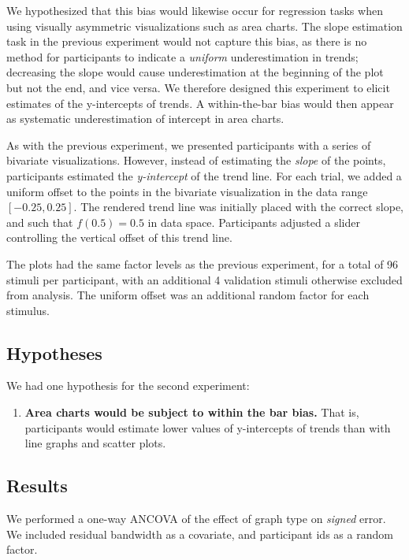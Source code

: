 \documentclass{sigchi}
\begin{document}
We hypothesized that this bias would likewise occur for regression tasks when using visually asymmetric visualizations such as area charts. The slope estimation task in the previous experiment would not capture this bias, as there is no method for participants to indicate a \emph{uniform} underestimation in trends; decreasing the slope would cause underestimation at the beginning of the plot but not the end, and vice versa. We therefore designed this experiment to elicit estimates of the y-intercepts of trends. A within-the-bar bias would then appear as systematic underestimation of intercept in area charts.

As with the previous experiment, we presented participants with a series of bivariate visualizations. However, instead of estimating the \emph{slope} of the points, participants estimated the \emph{y-intercept} of the trend line. For each trial, we added a uniform offset to the points in the bivariate visualization in the data range $[-0.25,0.25]$. The rendered trend line was initially placed with the correct slope, and such that $f(0.5)=0.5$ in data space. Participants adjusted a slider controlling the vertical offset of this trend line.

The plots had the same factor levels as the previous experiment, for a total of 96 stimuli per participant, with an additional 4 validation stimuli otherwise excluded from analysis. The uniform offset was an additional random factor for each stimulus.

\subsection{Hypotheses}

We had one hypothesis for the second experiment:
\begin{enumerate}
	\item \textbf{Area charts would be subject to within the bar bias.} That is, participants would estimate lower values of y-intercepts of trends than with line graphs and scatter plots.
\end{enumerate}

\subsection{Results}
We performed a one-way ANCOVA of the effect of graph type on \emph{signed} error. We included residual bandwidth as a covariate, and participant ids as a random factor.
\end{document}
